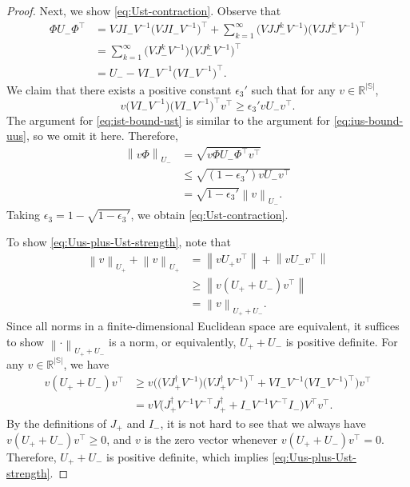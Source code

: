 \documentclass[11pt,letterpaper]{article}
\theoremstyle{plain}
\theoremstyle{definition}
\theoremstyle{remark}
\newcommand{\norm}[1]{\left\lVert#1\right\rVert}
\newcommand{\R}{\mathbb{R}}
\newcommand{\sspa}{\mathbb{S}}
\newcommand{\gapst}{\epsilon_3}
\newcommand{\subus}{+}%
\newcommand{\subst}{-}%
\newcommand{\Jus}{J_{\subus}}
\newcommand{\Jst}{J_{\subst}}
\newcommand{\Ist}{I_{\subst}}
\newcommand{\Uus}{U_{\subus}}
\newcommand{\Ust}{U_{\subst}}
\begin{document}
\begin{proof}
    Next, we show \eqref{eq:Ust-contraction}. Observe that
    \begin{align*}
        \Phi \Ust \Phi^\top 
        &= V J \Ist V^{-1}  \big(V J \Ist V^{-1}\big)^{\top} + \sum_{k=1}^\infty \big(V J \Jst^k V^{-1} \big) \big(V J \Jst^k V^{-1}\big)^{\top} \\
        &= \sum_{k=1}^\infty \big(V \Jst^k V^{-1} \big) \big(V \Jst^k V^{-1}\big)^{\top} \\
        &= \Ust -  V \Ist V^{-1}  \big(V \Ist V^{-1}\big)^{\top}.
    \end{align*}
    We claim that there exists a positive constant $\gapst'$ such that for any $v\in \R^{|\sspa|}$,  
    \begin{equation}
        \label{eq:ist-bound-ust}
        v\big(V \Ist V^{-1}\big)\big(V \Ist V^{-1}\big)^\top v^\top \geq \gapst' v \Ust v^\top.
    \end{equation}
    The argument for \eqref{eq:ist-bound-ust} is similar to the argument for \eqref{eq:ius-bound-uus}, so we omit it here. 
    Therefore, 
    \begin{align*}
        \norm{v\Phi}_{\Ust} &= \sqrt{v\Phi \Ust \Phi^\top v^\top} \\
        &\leq \sqrt{(1-\gapst')v\Ust v^\top} \\
        &= \sqrt{1-\gapst'} \norm{v}_{\Ust}. 
    \end{align*}
    Taking $\gapst = 1 - \sqrt{1-\gapst'}$, we obtain \eqref{eq:Ust-contraction}. 
    
    
    To show \eqref{eq:Uus-plus-Ust-strength}, note that 
    \begin{align*}
        \norm{v}_{\Uus} +  \norm{v}_{\Uus}
        &= \norm{v \Uus v^\top} + \norm{v \Ust v^\top}  \\
        &\geq \norm{v (\Uus+\Ust) v^\top} \\
        &= \norm{v}_{\Uus+\Ust}.
    \end{align*}
    Since all norms in a finite-dimensional Euclidean space are equivalent, it suffices to show $\norm{\cdot}_{\Uus+\Ust}$ is a norm, or equivalently, $\Uus+\Ust$ is positive definite. For any $v\in \R^{|\sspa|}$, we have
    \begin{align*}
        v (\Uus+\Ust) v^\top 
        &\geq v \Big(\big(V \Jus^{\dagger} V^{-1}\big) \big(V \Jus^{\dagger} V^{-1}\big)^{\top} + V \Ist V^{-1}  \big(V \Ist V^{-1}\big)^{\top} \Big) v^\top \\
        &= vV \big(\Jus^\dagger V^{-1} V^{-\top} \Jus^\dagger + \Ist V^{-1} V^{-\top} \Ist  \big)   V^\top v^\top. 
    \end{align*}
    By the definitions of $\Jus$ and $\Ist$, it is not hard to see that we always have $v (\Uus+\Ust) v^\top \geq 0$, and $v$ is the zero vector whenever $v (\Uus+\Ust) v^\top = 0$. Therefore, $\Uus+\Ust$ is positive definite, which implies \eqref{eq:Uus-plus-Ust-strength}. 
\end{proof}
\end{document}

